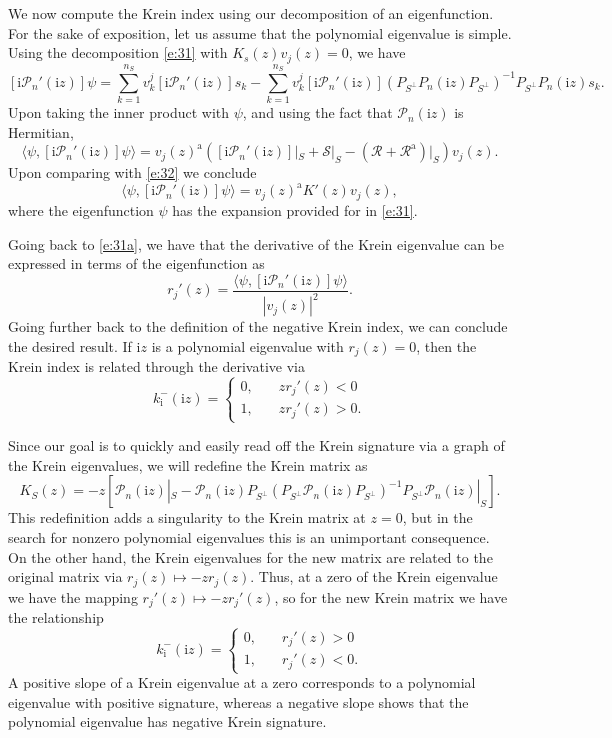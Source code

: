 \documentclass[review,onefignum,onetabnum]{siamart171218}
\newcommand{\rma}{\mathrm{a}}
\newcommand{\rmi}{\mathrm{i}}
\newcommand{\calP}{\mathcal{P}}
\newcommand{\calR}{\mathcal{R}}
\newcommand{\calS}{\mathcal{S}}
\newcommand{\vK}{\bm{\mathit{K}}}
\newcommand{\vv}{\bm{\mathit{v}}}
\newcommand{\vn}{\bm{\mathit{0}}}
\begin{document}
We now compute the Krein index using our decomposition of an eigenfunction.
For the sake of exposition, let us assume that the polynomial eigenvalue is
simple. Using the decomposition \cref{e:31} with $\vK_s(z)\vv_j(z)=\vn$, we
have
\[
[\rmi\calP_n'(\rmi z)]\psi=\sum_{k=1}^{n_S}v_k^j[\rmi\calP_n'(\rmi z)]s_k-
\sum_{k=1}^{n_S}v_k^j[\rmi\calP_n'(\rmi z)]
\left(P_{S^\perp}P_n(\rmi z)P_{S^\perp}\right)^{-1}P_{S^\perp}P_n(\rmi z)s_k.
\]
Upon taking the inner product with $\psi$, and using the fact that
$\calP_n(\rmi z)$ is Hermitian,
\[
\langle\psi,[\rmi\calP_n'(\rmi z)]\psi\rangle=
\vv_j(z)^\rma\left([\rmi\calP_n'(\rmi z)]|_S+\calS|_S-(\calR+\calR^\rma)|_S\right)\vv_j(z).
\]
Upon comparing with \cref{e:32} we conclude
\[
\langle\psi,[\rmi\calP_n'(\rmi z)]\psi\rangle=\vv_j(z)^\rma\vK'(z)\vv_j(z),
\]
where the eigenfunction $\psi$ has the expansion provided for in \cref{e:31}.

Going back to \cref{e:31a}, we have that the derivative of the Krein
eigenvalue can be expressed in terms of the eigenfunction as
\[
r_j'(z)=\frac{\langle\psi,[\rmi\calP_n'(\rmi z)]\psi\rangle}{|\vv_j(z)|^2}.
\]
Going further back to the
definition of the negative Krein index, we can conclude the desired result.
If $\rmi z$ is a polynomial eigenvalue with $r_j(z)=0$, then the Krein index
is related through the derivative via
\[
k_\rmi^-(\rmi z)=\begin{cases}0,\quad&zr_j'(z)<0\\1,\quad&zr_j'(z)>0.\end{cases}
\]

Since our goal is to quickly and easily read off the Krein signature via a
graph of the Krein eigenvalues, we will redefine the Krein matrix as
\[
\vK_S(z)=-z\left[\calP_n(\rmi z)|_S-%
\calP_n(\rmi z)P_{S^\perp}(P_{S^\perp}\calP_n(\rmi z)P_{S^\perp})^{-1}P_{S^\perp}\calP_n(\rmi z)|_{S}\right].
\]
This redefinition adds a singularity to the Krein matrix at $z=0$, but in the search for nonzero polynomial eigenvalues this is an unimportant consequence. On the other hand, the Krein eigenvalues for the new matrix are related to the original matrix
via $r_j(z)\mapsto -zr_j(z)$.
Thus, at a zero of the Krein eigenvalue we have
the mapping $r_j'(z)\mapsto -zr_j'(z)$, so for the new Krein matrix we have
the relationship
\[
k_\rmi^-(\rmi z)=\begin{cases}0,\quad&r_j'(z)>0\\1,\quad&r_j'(z)<0.\end{cases}
\]
A positive slope of a Krein eigenvalue at a zero corresponds to a polynomial
eigenvalue with positive signature, whereas a negative slope shows that the
polynomial eigenvalue has negative Krein signature.
\end{document}
